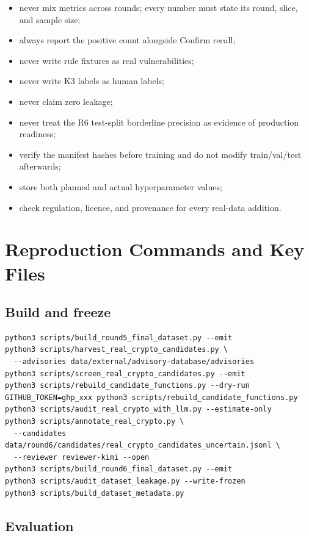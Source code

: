 \documentclass[11pt]{article}
\newcommand{\code}[1]{\texttt{\detokenize{#1}}}
\begin{document}
\begin{itemize}
  \item never mix metrics across rounds; every number must state its round, slice, and sample size;
  \item always report the positive count alongside Confirm recall;
  \item never write \code{verified=false} rule fixtures as real vulnerabilities;
  \item never write K3 labels as human labels;
  \item never claim zero leakage;
  \item never treat the R6 test-split borderline precision as evidence of production readiness;
  \item verify the manifest hashes before training and do not modify train/val/test afterwards;
  \item store both planned and actual hyperparameter values;
  \item check regulation, licence, and provenance for every real-data addition.
\end{itemize}

\appendix

\section{Reproduction Commands and Key Files}

\subsection{Build and freeze}

\begin{Verbatim}[fontsize=\small]
python3 scripts/build_round5_final_dataset.py --emit
python3 scripts/harvest_real_crypto_candidates.py \
  --advisories data/external/advisory-database/advisories
python3 scripts/screen_real_crypto_candidates.py --emit
python3 scripts/rebuild_candidate_functions.py --dry-run
GITHUB_TOKEN=ghp_xxx python3 scripts/rebuild_candidate_functions.py
python3 scripts/audit_real_crypto_with_llm.py --estimate-only
python3 scripts/annotate_real_crypto.py \
  --candidates data/round6/candidates/real_crypto_candidates_uncertain.jsonl \
  --reviewer reviewer-kimi --open
python3 scripts/build_round6_final_dataset.py --emit
python3 scripts/audit_dataset_leakage.py --write-frozen
python3 scripts/build_dataset_metadata.py
\end{Verbatim}

\subsection{Evaluation}
\end{document}
